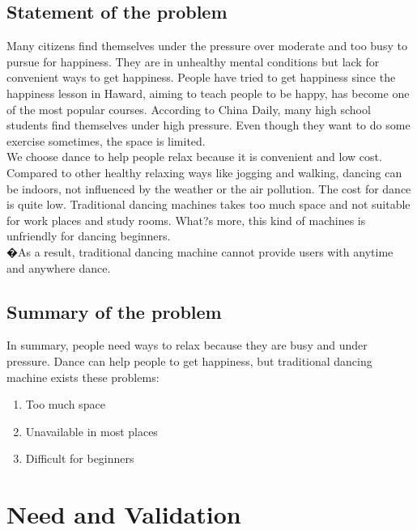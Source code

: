 \documentclass{article}
\begin{document}
\subsection{Statement of the problem}
\hspace*{2em}Many citizens find themselves under the pressure over moderate and too busy to pursue for happiness. They are in unhealthy mental conditions but lack for convenient ways to get happiness. People have tried to get happiness since the happiness lesson in Haward, aiming to teach people to be happy, has become one of the most popular courses. According to China Daily, many high school students find themselves under high pressure. Even though they want to do some exercise sometimes, the space is limited.\\
\hspace*{2em}We choose dance to help people relax because it is convenient and low cost. Compared to other healthy relaxing ways like jogging and walking, dancing can be indoors, not influenced by the weather or the air pollution. The cost for dance is quite low. Traditional dancing machines takes too much space and not suitable for work places and study rooms. What?s more, this kind of machines is unfriendly for dancing beginners.\\
�\hspace*{2em}As a result, traditional dancing machine cannot provide users with anytime and anywhere dance. \\
\subsection{Summary of the problem}
\hspace*{2em}In summary, people need ways to relax because they are busy and under pressure. Dance can help people to get happiness, but traditional dancing machine exists these problems:
\begin{enumerate}[\hspace*{3em}(1)  ]
\item Too much space
\item Unavailable in most places
\item Difficult for beginners
\end{enumerate}

\section{Need and Validation}
\end{document}
